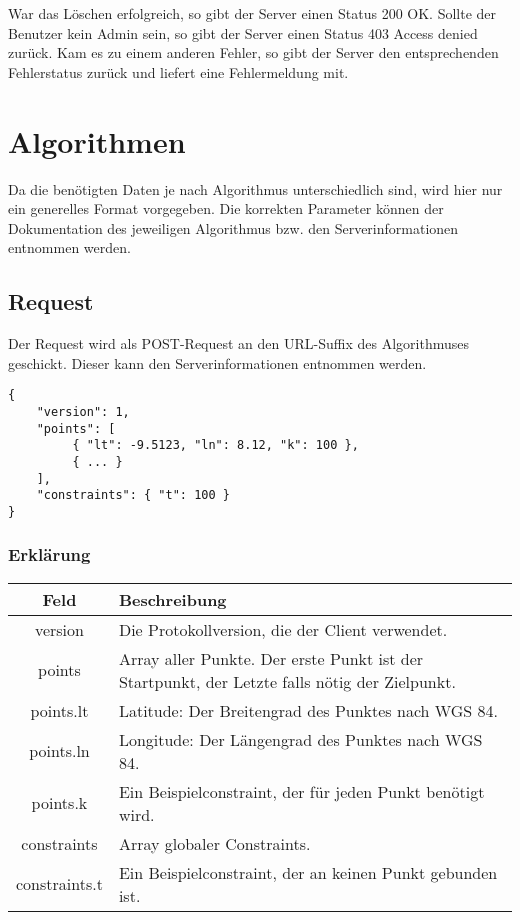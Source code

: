 \documentclass[ngerman]{scrartcl}
\begin{document}
		War das Löschen erfolgreich, so gibt der Server einen Status 200 OK.
		Sollte der Benutzer kein Admin sein, so gibt der Server einen Status 403 Access denied zurück.
		Kam es zu einem anderen Fehler, so gibt der Server den entsprechenden Fehlerstatus zurück und liefert eine Fehlermeldung mit.
		
   	
\section{Algorithmen}

Da die benötigten Daten je nach Algorithmus unterschiedlich sind, wird hier nur ein generelles Format vorgegeben. Die korrekten Parameter können der Dokumentation des jeweiligen Algorithmus bzw. den Serverinformationen entnommen werden.

	\subsection*{Request}
	
	Der Request wird als POST-Request an den URL-Suffix des Algorithmuses geschickt. Dieser kann den Serverinformationen entnommen werden.
	
	\begin{lstlisting}
{
    "version": 1,
    "points": [
         { "lt": -9.5123, "ln": 8.12, "k": 100 },
         { ... }
    ],
    "constraints": { "t": 100 }
}    	
	\end{lstlisting}
	
		\subsubsection*{Erklärung}
	
	    \noindent \begin{tabular}{|c|p{12cm}|}
	    	\hline
	    	\textbf{Feld} & \textbf{Beschreibung} \\ 
	    	\hline \hline
	    	
	    	version & Die Protokollversion, die der Client verwendet.\\
	    	\hline
	    	
	    	points & Array aller Punkte. Der erste Punkt ist der Startpunkt, der Letzte falls nötig der Zielpunkt. \\ 
	    	\hline
	    	
	    	points.lt & Latitude: Der Breitengrad des Punktes nach WGS 84. \\ 
	    	\hline
	    	
	    	points.ln & Longitude: Der Längengrad des Punktes nach WGS 84. \\
	    	\hline
	    	
	    	points.k & Ein Beispielconstraint, der für jeden Punkt benötigt wird.\\ 
	    	\hline
	    	
	    	constraints & Array globaler Constraints.\\ 
	    	\hline
	    	
	    	constraints.t & Ein Beispielconstraint, der an keinen Punkt gebunden ist.\\ 
	    	\hline
	    \end{tabular}
    
\end{document}
